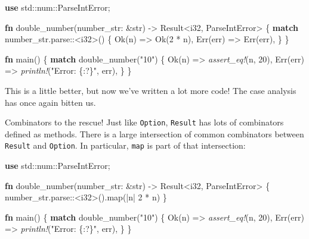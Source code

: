\documentclass[a4paper,]{book}
\newenvironment{Shaded}{\begin{snugshade}}{\end{snugshade}}
\newcommand{\KeywordTok}[1]{\textcolor[rgb]{0.13,0.29,0.53}{\textbf{{#1}}}}
\newcommand{\DataTypeTok}[1]{\textcolor[rgb]{0.13,0.29,0.53}{{#1}}}
\newcommand{\DecValTok}[1]{\textcolor[rgb]{0.00,0.00,0.81}{{#1}}}
\newcommand{\ConstantTok}[1]{\textcolor[rgb]{0.00,0.00,0.00}{{#1}}}
\newcommand{\StringTok}[1]{\textcolor[rgb]{0.31,0.60,0.02}{{#1}}}
\newcommand{\PreprocessorTok}[1]{\textcolor[rgb]{0.56,0.35,0.01}{\textit{{#1}}}}
\newcommand{\NormalTok}[1]{{#1}}
\begin{document}
\begin{Shaded}
\begin{Highlighting}[]
\KeywordTok{use} \NormalTok{std::num::ParseIntError;}

\KeywordTok{fn} \NormalTok{double_number(number_str: &}\DataTypeTok{str}\NormalTok{) -> }\DataTypeTok{Result}\NormalTok{<}\DataTypeTok{i32}\NormalTok{, ParseIntError> \{}
    \KeywordTok{match} \NormalTok{number_str.parse::<}\DataTypeTok{i32}\NormalTok{>() \{}
        \ConstantTok{Ok}\NormalTok{(n) => }\ConstantTok{Ok}\NormalTok{(}\DecValTok{2} \NormalTok{* n),}
        \ConstantTok{Err}\NormalTok{(err) => }\ConstantTok{Err}\NormalTok{(err),}
    \NormalTok{\}}
\NormalTok{\}}

\KeywordTok{fn} \NormalTok{main() \{}
    \KeywordTok{match} \NormalTok{double_number(}\StringTok{"10"}\NormalTok{) \{}
        \ConstantTok{Ok}\NormalTok{(n) => }\PreprocessorTok{assert_eq!}\NormalTok{(n, }\DecValTok{20}\NormalTok{),}
        \ConstantTok{Err}\NormalTok{(err) => }\PreprocessorTok{println!}\NormalTok{(}\StringTok{"Error: \{:?\}"}\NormalTok{, err),}
    \NormalTok{\}}
\NormalTok{\}}
\end{Highlighting}
\end{Shaded}

This is a little better, but now we've written a lot more code! The case
analysis has once again bitten us.

Combinators to the rescue! Just like \texttt{Option}, \texttt{Result}
has lots of combinators defined as methods. There is a large
intersection of common combinators between \texttt{Result} and
\texttt{Option}. In particular, \texttt{map} is part of that
intersection:

\begin{Shaded}
\begin{Highlighting}[]
\KeywordTok{use} \NormalTok{std::num::ParseIntError;}

\KeywordTok{fn} \NormalTok{double_number(number_str: &}\DataTypeTok{str}\NormalTok{) -> }\DataTypeTok{Result}\NormalTok{<}\DataTypeTok{i32}\NormalTok{, ParseIntError> \{}
    \NormalTok{number_str.parse::<}\DataTypeTok{i32}\NormalTok{>().map(|n| }\DecValTok{2} \NormalTok{* n)}
\NormalTok{\}}

\KeywordTok{fn} \NormalTok{main() \{}
    \KeywordTok{match} \NormalTok{double_number(}\StringTok{"10"}\NormalTok{) \{}
        \ConstantTok{Ok}\NormalTok{(n) => }\PreprocessorTok{assert_eq!}\NormalTok{(n, }\DecValTok{20}\NormalTok{),}
        \ConstantTok{Err}\NormalTok{(err) => }\PreprocessorTok{println!}\NormalTok{(}\StringTok{"Error: \{:?\}"}\NormalTok{, err),}
    \NormalTok{\}}
\NormalTok{\}}
\end{Highlighting}
\end{Shaded}
\end{document}
